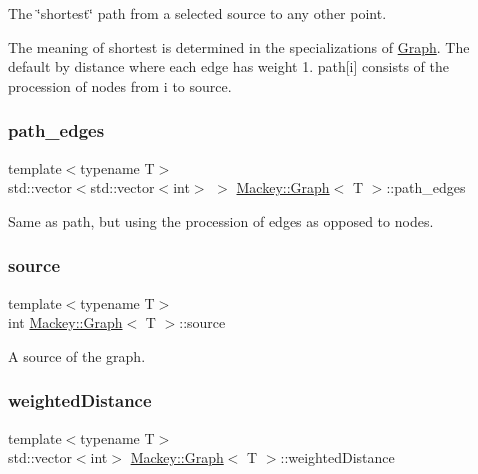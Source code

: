 The \char`\"{}shortest\char`\"{} path from a selected source to any other point. 

The meaning of shortest is determined in the specializations of \hyperlink{classMackey_1_1Graph}{Graph}. The default by distance where each edge has weight 1. path\mbox{[}i\mbox{]} consists of the procession of nodes from i to source. \mbox{\label{classMackey_1_1Graph_ae704812b28d290b7d3742ea3745b5edf}} 
\subsubsection{\texorpdfstring{path\+\_\+edges}{path\_edges}}
{\footnotesize\ttfamily template$<$typename T$>$ \\
std\+::vector$<$std\+::vector$<$int$>$ $>$ \hyperlink{classMackey_1_1Graph}{Mackey\+::\+Graph}$<$ T $>$\+::path\+\_\+edges}



Same as path, but using the procession of edges as opposed to nodes. 

\mbox{\label{classMackey_1_1Graph_a43657a07a21a2dcf422876400360ed5b}} 
\subsubsection{\texorpdfstring{source}{source}}
{\footnotesize\ttfamily template$<$typename T$>$ \\
int \hyperlink{classMackey_1_1Graph}{Mackey\+::\+Graph}$<$ T $>$\+::source\hspace{0.3cm}{\ttfamily [protected]}}



A source of the graph. 

\mbox{\label{classMackey_1_1Graph_ab14d4c1bcbe1a994d28a6c590b27ba8b}} 
\subsubsection{\texorpdfstring{weighted\+Distance}{weightedDistance}}
{\footnotesize\ttfamily template$<$typename T$>$ \\
std\+::vector$<$int$>$ \hyperlink{classMackey_1_1Graph}{Mackey\+::\+Graph}$<$ T $>$\+::weighted\+Distance}



